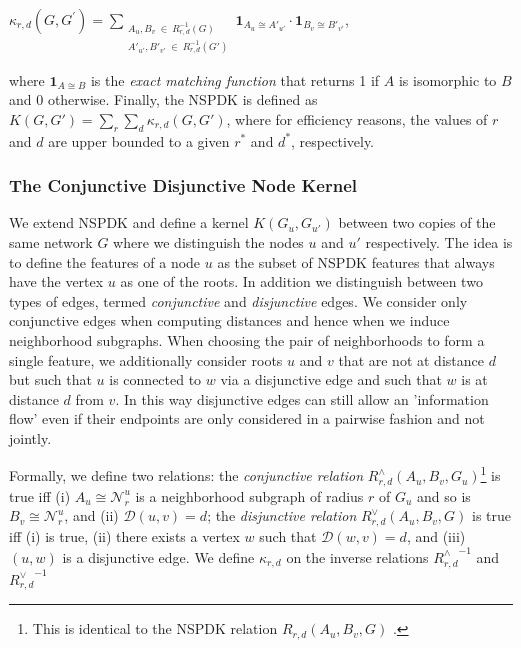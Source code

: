 \documentclass{esannV2}
\begin{document}
\begin{center}
$\kappa_{r,d}(G,G^{'}) = 
\!\!\!\!\!\!\!\!\!\!\!\! 
\sum\limits_{\substack{A_u, B_v \ \in \ R_{r,d}^{-1}(G) \\ 
{A'}_{u'}, {B'}_{v'} \ \in \ R_{r,d}^{-1}(G')
}} \!\!\!\!\!\!\!\!\!\!\!\!  { { \textbf{1}_{A_{u} \cong A'_{u'}}} \cdot {
\textbf{1}_{B_{v} \cong B'_{v'}}} }$, 
\end{center} 


where $\textbf{1}_{A \cong
B}$ is the \textit{exact matching function} that returns 1 if $A$ is
isomorphic to $B$ and 0 otherwise.  Finally, the NSPDK is defined as $K(G,G')
= \sum\limits_{r}{\sum\limits_{d}{\kappa_{r,d}(G,G')}}$, where for efficiency
reasons, the values of $r$ and $d$ are upper bounded to a given $r^*$ and
$d^*$, respectively.

\subsubsection{The Conjunctive Disjunctive Node Kernel}

We extend NSPDK and define a kernel $K(G_u,G_{u'})$ between two copies of the
same network $G$ where we distinguish the nodes $u$ and $u'$ respectively. The
idea is to define the features of a node $u$ as the subset of NSPDK features
that always have the vertex $u$ as one of the roots. In addition we
distinguish between two types of edges, termed {\em conjunctive} and {\em
disjunctive} edges. We consider only conjunctive edges when computing
distances and hence when we induce neighborhood subgraphs. When choosing the
pair of neighborhoods to form a single feature, we additionally consider roots
$u$ and $v$ that are not at distance $d$ but such that $u$ is connected to $w$
via a disjunctive edge and such that $w$ is at distance $d$ from $v$. In this
way disjunctive edges can still allow an 'information flow' even if their
endpoints are only considered in a pairwise fashion and not jointly.

Formally, we define two relations: the \textit{conjunctive relation}
$R^{\wedge}_{r,d}(A_u, B_v, G_u)$\footnote{This is identical to the NSPDK relation $R_{r,d}(A_u, B_v, G)$ .}  is true iff (i) $A_u \cong \mathcal{N}_r^u$ is a neighborhood subgraph of radius $r$ of $G_u$ and so is $B_v \cong \mathcal{N}_r^u$,  and (ii) $\mathcal{D}(u,v)= d$; the
\textit{disjunctive relation} $R_{r,d}^{\vee}(A_u, B_v, G)$ is true iff (i)
is true, (ii) there
exists a vertex $w$ such that $\mathcal{D}(w,v)= d$, and (iii) $(u,w)$ is a
disjunctive edge. We define $\kappa_{r,d}$ on the  inverse relations ${R^{\wedge}_{r,d}}^{ -1}$
and ${R^{\vee}_{r,d}}^{ -1}$
\end{document}
